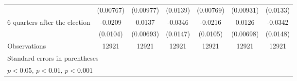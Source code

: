 \begin{table}[!ht]
\begin{tabular}{l*{6}{c}}
                    &   (0.00767)         &   (0.00977)         &    (0.0139)         &   (0.00769)         &   (0.00931)         &    (0.0133)         \\
[1em]
 6 quarters after the election&     -0.0209\sym{*}  &      0.0137\sym{*}  &     -0.0346\sym{*}  &     -0.0216\sym{*}  &      0.0126         &     -0.0342\sym{*}  \\
                    &    (0.0104)         &   (0.00693)         &    (0.0147)         &    (0.0105)         &   (0.00698)         &    (0.0148)         \\
\hline
Observations        &       12921         &       12921         &       12921         &       12921         &       12921         &       12921         \\
\hline\hline
\multicolumn{7}{l}{\footnotesize Standard errors in parentheses}\\
\multicolumn{7}{l}{\footnotesize \sym{*} \(p<0.05\), \sym{**} \(p<0.01\), \sym{***} \(p<0.001\)}\\
\end{tabular}
\end{table}
